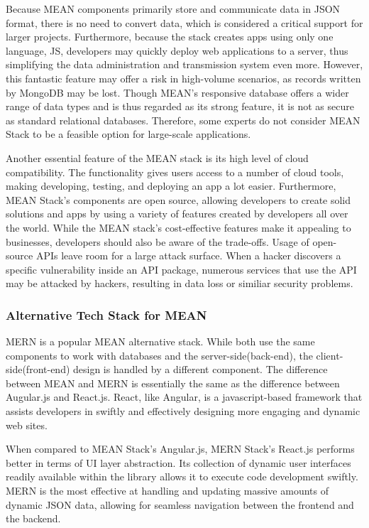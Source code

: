 \documentclass[a4paper, 11pt]{report}
\begin{document}
Because MEAN components primarily store and communicate data in JSON format, there is no need to convert data, which is considered a critical support for larger projects. \cite{isaac13} Furthermore, because the stack creates apps using only one language, JS, developers may quickly deploy web applications to a server, thus simplifying the data administration and transmission system even more. \cite{isaac13} However, this fantastic feature may offer a risk in high-volume scenarios, as records written by MongoDB may be lost. Though MEAN’s responsive database offers a wider range of data types and is thus regarded as its strong feature, it is not as secure as standard relational databases. \cite{isaac13} Therefore, some experts do not consider MEAN Stack to be a feasible option for large-scale applications.

Another essential feature of the MEAN stack is its high level of cloud compatibility. The functionality gives users access to a number of cloud tools, making developing, testing, and deploying an app a lot easier. Furthermore, \cite{isaac13} MEAN Stack's components are open source, allowing developers to create solid solutions and apps by using a variety of features created by developers all over the world. \cite{isaac13}  While the MEAN stack's cost-effective features make it appealing to businesses, developers should also be aware of the trade-offs. Usage of open-source APIs leave room for a large attack surface. When a hacker discovers a specific vulnerability inside an API package, numerous services that use the API may be attacked by hackers, resulting in data loss or similiar security problems.\cite{isaac13} 


\subsubsection{Alternative Tech Stack for MEAN}

MERN is a popular MEAN alternative stack. While both use the same components to work with databases and the server-side(back-end), the client-side(front-end) design is handled by a different component. The difference between MEAN and MERN is essentially the same as the difference between Augular.js and React.js. React, like Angular, is a javascript-based framework that assists developers in swiftly and effectively designing more engaging and dynamic web sites.

When compared to MEAN Stack's Angular.js, MERN Stack's React.js performs better in terms of UI layer abstraction. Its collection of dynamic user interfaces readily available within the library allows it to execute code development swiftly. \cite{isaac14} MERN is the most effective at handling and updating massive amounts of dynamic JSON data, allowing for seamless navigation between the frontend and the backend. \cite{isaac14}
\end{document}
